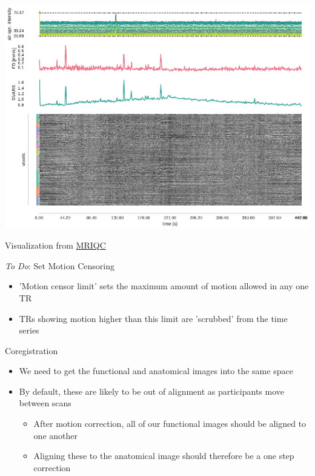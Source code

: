 \documentclass[t,12pt]{beamer}
\begin{document}
\begin{frame}{}
\vspace{10pt}
\centering
\includegraphics[width=\textwidth]{images/mriqc_plot.jpg} \\
\vspace{-10pt}
\begin{block}{}
Visualization from \href{http://mriqc.readthedocs.io/en/latest/index.html}{MRIQC}
\end{block}
\end{frame}

\begin{frame}{\emph{To Do}: Set Motion Censoring}
\vspace{10pt}
\begin{itemize}
\setlength\itemsep{1em}
\item 'Motion censor limit' sets the maximum amount of motion allowed in any one TR
\item TRs showing motion higher than this limit are 'scrubbed' from the time series
\end{itemize}
\end{frame}

\begin{frame}{Coregistration}
\vspace{10pt}
\begin{itemize}
\setlength\itemsep{1em}
\item We need to get the functional and anatomical images into the same space
\item By default, these are likely to be out of alignment as participants move between scans
\vspace{4pt}
\begin{itemize}
\setlength\itemsep{0.5em}
\item After motion correction, all of our functional images should be aligned to one another
\item Aligning these to the anatomical image should therefore be a one step correction
\end{itemize}
\end{itemize}
\end{frame}
\end{document}
